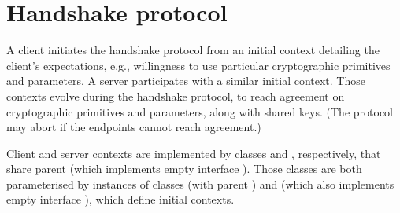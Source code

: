 \section{Handshake protocol}\label{sec:handshake}



A client initiates the handshake protocol from an initial context detailing the client's 
expectations, e.g., willingness to use particular cryptographic primitives and parameters.
A server participates with a similar initial context.
Those contexts evolve during the handshake protocol, to reach agreement on cryptographic
primitives and parameters, along with shared keys.
(The protocol may abort if the endpoints cannot reach agreement.)


\ifPresentationNotes{}\fi


\begin{tcolorbox}
Client and server contexts are implemented by classes  and
, respectively, that share parent
 (which implements empty interface ).
Those classes are both parameterised by instances of classes  (with parent
) and  (which also implements empty 
interface ), which define initial contexts.
\end{tcolorbox}





